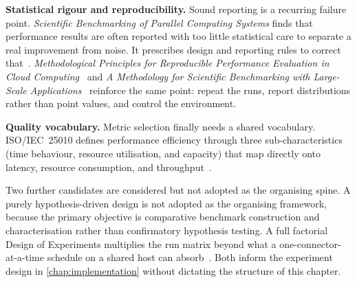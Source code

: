 \textbf{Statistical rigour and reproducibility.} Sound reporting is a recurring failure point. \emph{Scientific Benchmarking of Parallel Computing Systems} finds that performance results are often reported with too little statistical care to separate a real improvement from noise. It prescribes design and reporting rules to correct that~\citep{hoefler2015scientific}. \emph{Methodological Principles for Reproducible Performance Evaluation in Cloud Computing}~\citep{papadopoulos2021reproducible} and \emph{A Methodology for Scientific Benchmarking with Large-Scale Applications}~\citep{armstrong2001large} reinforce the same point: repeat the runs, report distributions rather than point values, and control the environment.

\pagebreak

\textbf{Quality vocabulary.} Metric selection finally needs a shared vocabulary. ISO/IEC~25010 defines performance efficiency through three sub-characteristics (time behaviour, resource utilisation, and capacity) that map directly onto latency, resource consumption, and throughput~\citep{iso25010}.

Two further candidates are considered but not adopted as the organising spine. A purely hypothesis-driven design is not adopted as the organising framework, because the primary objective is comparative benchmark construction and characterisation rather than confirmatory hypothesis testing. A full factorial Design of Experiments multiplies the run matrix beyond what a one-connector-at-a-time schedule on a shared host can absorb~\citep{jain1991art}. Both inform the experiment design in \cref{chap:implementation} without dictating the structure of this chapter.

